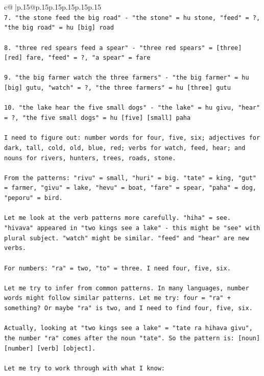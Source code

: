 \documentclass{article}
\begin{document}
{\begin{supertabular}{c@{$\;$}|p{.15\linewidth}@{}p{.15\linewidth}p{.15\linewidth}p{.15\linewidth}p{.15\linewidth}p{.15\linewidth}}
{{{\\ 
\texttt{7. "the stone feed the big road" {-} "the stone" = hu stone, "feed" = ?, "the big road" = hu {[}big{]} road} \\
\\ 
\texttt{8. "three red spears feed a spear" {-} "three red spears" = {[}three{]} {[}red{]} fare, "feed" = ?, "a spear" = fare} \\
\\ 
\texttt{9. "the big farmer watch the three farmers" {-} "the big farmer" = hu {[}big{]} gutu, "watch" = ?, "the three farmers" = hu {[}three{]} gutu} \\
\\ 
\texttt{10. "the lake hear the five small dogs" {-} "the lake" = hu givu, "hear" = ?, "the five small dogs" = hu {[}five{]} {[}small{]} paha} \\
\\ 
\texttt{I need to figure out: number words for four, five, six; adjectives for dark, tall, cold, old, blue, red; verbs for watch, feed, hear; and nouns for rivers, hunters, trees, roads, stone.} \\
\\ 
\texttt{From the patterns: "rivu" = small, "huri" = big. "tate" = king, "gut" = farmer, "givu" = lake, "hevu" = boat, "fare" = spear, "paha" = dog, "peporu" = bird.} \\
\\ 
\texttt{Let me look at the verb patterns more carefully. "hiha" = see. "hivava" appeared in "two kings see a lake" {-} this might be "see" with plural subject. "watch" might be similar. "feed" and "hear" are new verbs.} \\
\\ 
\texttt{For numbers: "ra" = two, "to" = three. I need four, five, six.} \\
\\ 
\texttt{Let me try to infer from common patterns. In many languages, number words might follow similar patterns. Let me try: four = "ra" + something? Or maybe "ra" is two, and I need to find four, five, six.} \\
\\ 
\texttt{Actually, looking at "two kings see a lake" = "tate ra hihava givu", the number "ra" comes after the noun "tate". So the pattern is: {[}noun{]} {[}number{]} {[}verb{]} {[}object{]}.} \\
\\ 
\texttt{Let me try to work through with what I know:} \\
\\ 
}}}
\end{supertabular}}
\end{document}
